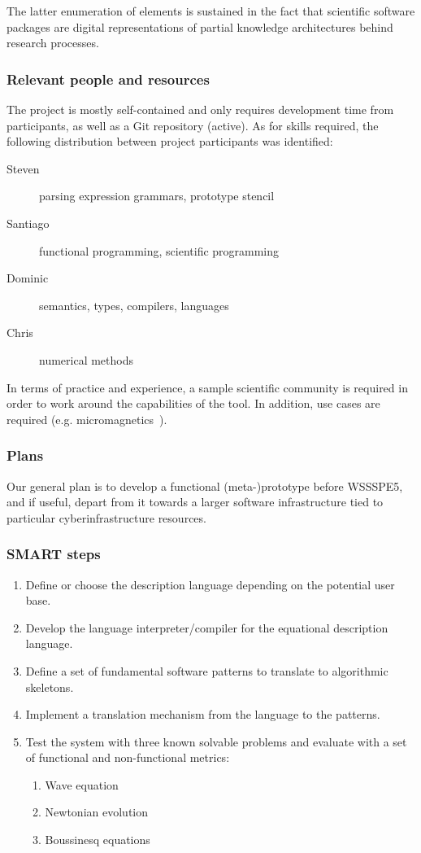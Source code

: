 The latter enumeration of elements is sustained in the fact that scientific
software packages are digital representations of partial knowledge architectures
behind research processes.

\subsubsection{Relevant people and resources}

The project is mostly self-contained and only requires development time from
participants, as well as a Git repository (active). As for skills required, the
following distribution between project participants was identified:

\begin{description}
  \item[Steven] parsing expression grammars, prototype stencil
  \item[Santiago] functional programming, scientific programming
  \item[Dominic] semantics, types, compilers, languages
  \item[Chris] numerical methods
\end{description}

In terms of practice and experience, a sample scientific community is required
in order to work around the capabilities of the tool. In addition, use cases
are required (e.g. micromagnetics~\cite{fischbacher2007systematic}).

\subsubsection{Plans}

Our general plan is to develop a functional (meta-)prototype before WSSSPE5, and
if useful, depart from it towards a larger software infrastructure tied to
particular cyberinfrastructure resources.

\subsubsection{SMART steps}

\begin{enumerate}
  \item Define or choose the description language depending on the potential user
  base.
  \item Develop the language interpreter/compiler for the equational description
  language.
  \item Define a set of fundamental software patterns to translate to algorithmic
  skeletons.
  \item Implement a translation mechanism from the language to the patterns.
  \item Test the system with three known solvable problems and evaluate with a
  set of functional and non-functional metrics:
  \begin{enumerate}
    \item Wave equation
    \item Newtonian evolution
    \item Boussinesq equations
  \end{enumerate}
\end{enumerate}

